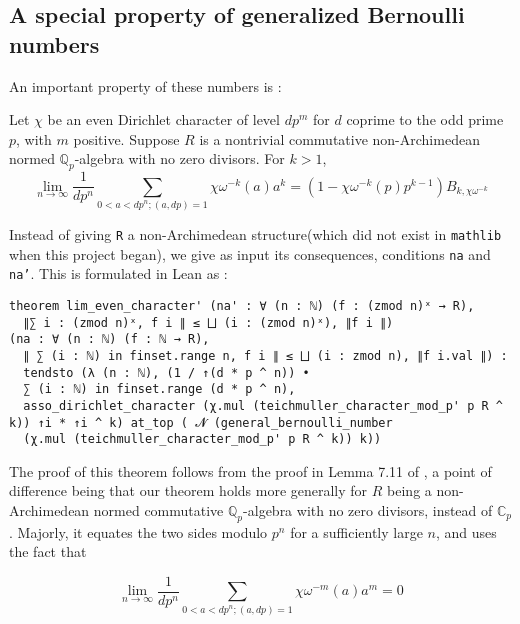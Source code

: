 \documentclass[a4paper,UKenglish,cleveref, autoref, thm-restate]{lipics-v2021}
\newcommand{\lean}[1]{\texttt{#1}\xspace} %
\begin{document}
\subsection{A special property of generalized Bernoulli numbers}
An important property of these numbers is : 
\begin{theorem}\label{thm1}
Let $\chi$ be an even Dirichlet character of level $dp^m$ for $d$ coprime to the odd prime $p$, with $m$ positive. 
Suppose $R$ is a nontrivial commutative non-Archimedean normed $\mathbb{Q}_p$-algebra with no zero divisors. 
For $k > 1$, 
$$ \lim_{n \to \infty} \frac{1}{dp^{n}} \sum_{0 < a < dp^{n} ; (a, dp) = 1} \chi \omega^{-k} (a) a^{k} = 
(1 - \chi \omega^{-k} (p) p^{k-1}) B_{k, \chi \omega^{-k}} $$
\end{theorem} 
Instead of giving \lean{R} a non-Archimedean structure(which did not exist in \lean{mathlib} when this project began), 
we give as input its consequences, conditions \lean{na} and \lean{na'}. This is formulated in Lean as :
\begin{lstlisting}
theorem lim_even_character' (na' : ∀ (n : ℕ) (f : (zmod n)ˣ → R), 
  ∥∑ i : (zmod n)ˣ, f i ∥ ≤ ⨆ (i : (zmod n)ˣ), ∥f i ∥)
(na : ∀ (n : ℕ) (f : ℕ → R), 
  ∥ ∑ (i : ℕ) in finset.range n, f i ∥ ≤ ⨆ (i : zmod n), ∥f i.val ∥) : 
  tendsto (λ (n : ℕ), (1 / ↑(d * p ^ n)) • 
  ∑ (i : ℕ) in finset.range (d * p ^ n),
  asso_dirichlet_character (χ.mul (teichmuller_character_mod_p' p R ^ k)) ↑i * ↑i ^ k) at_top ( 𝓝 (general_bernoulli_number 
  (χ.mul (teichmuller_character_mod_p' p R ^ k)) k))
\end{lstlisting}
The proof of this theorem follows from the proof in Lemma 7.11 of \cite{cyc}, a 
point of difference being that our theorem holds more generally for $R$ being a non-Archimedean normed commutative $\mathbb{Q}_p$-algebra with no zero divisors, 
instead of $\mathbb{C}_p$. Majorly, it equates the two sides modulo $p^n$ for a 
sufficiently large $n$, and uses the fact that 
\begin{theorem}\label{thm2}
  $$ \lim_{n \to \infty} \frac{1}{dp^{n}} \sum_{0 < a < dp^{n} ; (a, dp) = 1} \chi \omega^{-m} (a) a^{m} = 0 $$
\end{theorem}
\end{document}
